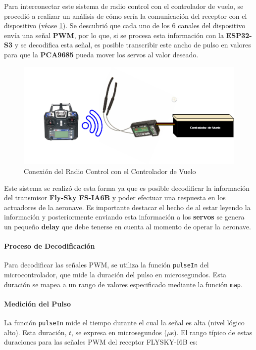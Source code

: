 Para interconectar este sistema de radio control con el controlador de vuelo, se procedió a realizar un análisis de cómo sería la comunicación del receptor con el dispositivo (véase \ref{fig:radio_arqui}). Se descubrió que cada uno de los 6 canales del dispositivo envía una señal \textbf{PWM}, por lo que, si se procesa esta información con la \textbf{ESP32-S3} y se decodifica esta señal, es posible transcribir este ancho de pulso en valores para que la \textbf{PCA9685} pueda mover los servos al valor deseado.


\begin{figure}[H]
    \centering
    \includegraphics[width=6 in]{Imagenes/Metodologia/Radio Control.drawio.png}
    \caption{Conexión del Radio Control con el Controlador de Vuelo}
    \label{fig:radio_arqui}
\end{figure}

Este sistema se realizó de esta forma ya que es posible decodificar la información del transmisor  \textbf{Fly-Sky FS-IA6B} y poder efectuar una respuesta en los actuadores de la aeronave. Es importante destacar el hecho de al estar leyendo la información y posteriormente  enviando esta información a los \textbf{servos} se genera un pequeño \textbf{delay} que debe tenerse en cuenta al momento de operar la aeronave.

\vspace{5 px}
\paragraph{\textbf{Proceso de Decodificación}}
\vspace{5 px}
Para decodificar las señales PWM, se utiliza la función \texttt{pulseIn} del microcontrolador, que mide la duración del pulso en microsegundos. Esta duración se mapea a un rango de valores especificado mediante la función \texttt{map}.
\vspace{5 px}
\paragraph{\textbf{Medición del Pulso}}
\vspace{5 px}
La función \texttt{pulseIn} mide el tiempo durante el cual la señal es alta (nivel lógico alto). Esta duración, \( t \), se expresa en microsegundos (\(\mu\)s). El rango típico de estas duraciones para las señales PWM del receptor FLYSKY-I6B es:

